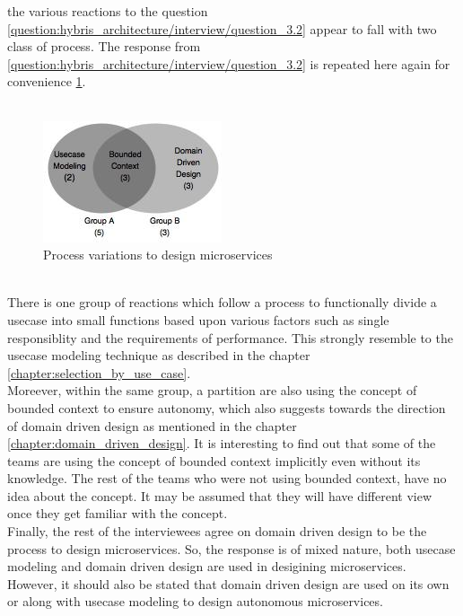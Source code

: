 the various reactions to the question \ref{question:hybris_architecture/interview/question_3.2} appear to fall with two class of process. The response from \ref{question:hybris_architecture/interview/question_3.2} is repeated here again for convenience \ref{fig:hybris_architecture/interview/process_variations_to_design_microservices}.\\
\\
\begin{figure}[H]
\begin{center}
\includegraphics[scale=0.5]{figures/hybris-architecture-three}
\caption{Process variations to design microservices}
\label{fig:hybris_architecture/interview/process_variations_to_design_microservices}
\end{center}
\end{figure}
\\
There is one group of reactions which follow a process to functionally divide a usecase into small functions based upon various factors such as single responsiblity and the requirements of performance. This strongly resemble to the usecase modeling technique as described in the chapter \ref{chapter:selection_by_use_case}. 
\\Moreever, within the same group, a partition are also using the concept of bounded context to ensure autonomy, which also suggests towards the direction of domain driven design as mentioned in the chapter \ref{chapter:domain_driven_design}. It is interesting to find out that some of the teams are using the concept of bounded context implicitly even without its knowledge. The rest of the teams who were not using bounded context, have no idea about the concept. It may be assumed that they will have different view once they get familiar with the concept.
\\
Finally, the rest of the interviewees agree on domain driven design to be the process to design microservices. So, the  response is of mixed nature, both usecase modeling and domain driven design are used in desigining microservices. However, it should also be stated that domain driven design are used on its own or along with usecase modeling to design autonomous microservices.

